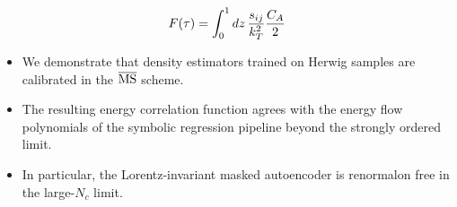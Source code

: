 \begin{equation}
  F(\tau) = \int_0^1 dz \, \frac{s_{ij}}{k_T^2} \frac{C_A}{2}
  \label{eq:5}
\end{equation}

\begin{itemize}
  \item We demonstrate that density estimators trained on Herwig samples are calibrated in the $\overline{\rm MS}$ scheme.
  \item The resulting energy correlation function agrees with the energy flow polynomials of the symbolic regression pipeline beyond the strongly ordered limit.
  \item In particular, the Lorentz-invariant masked autoencoder is renormalon free in the large-$N_c$ limit.
\end{itemize}

